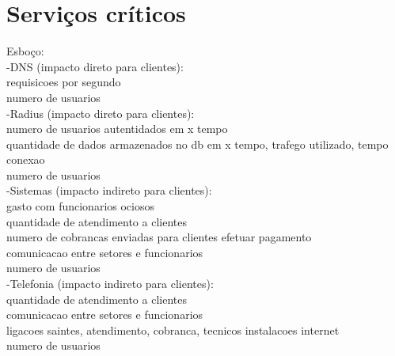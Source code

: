\section{Serviços críticos}
\label{section:servcrit}

Esboço:\\
-DNS (impacto direto para clientes): \\
requisicoes por segundo\\
numero de usuarios\\
-Radius (impacto direto para clientes): \\
numero de usuarios autentidados em x tempo\\
quantidade de dados armazenados no db em x tempo, trafego utilizado, tempo conexao\\
numero de usuarios\\
-Sistemas (impacto indireto para clientes): \\
gasto com funcionarios ociosos\\
quantidade de atendimento a clientes\\
numero de cobrancas enviadas para clientes efetuar pagamento\\
comunicacao entre setores e funcionarios\\
numero de usuarios\\
-Telefonia (impacto indireto para clientes): \\
quantidade de atendimento a clientes\\
comunicacao entre setores e funcionarios\\
ligacoes saintes, atendimento, cobranca, tecnicos instalacoes internet\\
numero de usuarios\\
